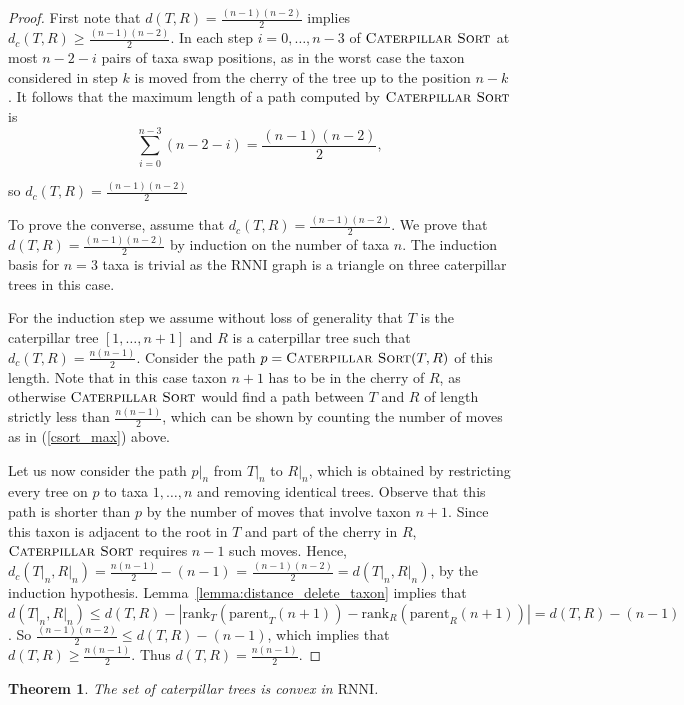\documentclass{amsart}
\newcommand{\parent}{\mathrm{parent}}
\newcommand{\rank}{\mathrm{rank}}
\newcommand{\rnni}{\mathrm{RNNI}}
\newcommand{\csort}{\textsc{Caterpillar Sort}}
\newtheorem{theorem}{Theorem}
\begin{document}
\begin{proof}
First note that $d(T,R) = \frac{(n-1)(n-2)}{2}$ implies $d_c(T,R) \geq \frac{(n-1)(n-2)}{2}$.
In each step $i=0, \ldots, n-3$ of $\csort$ at most $n-2-i$ pairs of taxa swap positions, as in the worst case the taxon considered in step $k$ is moved from the cherry of the tree up to the position $n-k$.
It follows that the maximum length of a path computed by $\csort$ is
\begin{equation}
\sum\limits_{i=0}^{n-3} (n-2-i) = \frac{(n-1)(n-2)}{2},
\label{csort_max}
\end{equation}

so $d_c(T,R) = \frac{(n-1)(n-2)}{2}$

To prove the converse, assume that $d_c(T,R) = \frac{(n-1)(n-2)}{2}$.
We prove that $d(T,R) = \frac{(n-1)(n-2)}{2}$ by induction on the number of taxa $n$.
The induction basis for $n=3$ taxa is trivial as the $\rnni$ graph is a triangle on three caterpillar trees in this case.

For the induction step we assume without loss of generality that $T$ is the caterpillar tree $[1, \ldots, n+1]$ and $R$ is a caterpillar tree such that $d_c(T, R) = \frac{n(n-1)}{2}$.
Consider the path $p = \csort(T, R)$ of this length.
Note that in this case taxon $n+1$ has to be in the cherry of $R$, as otherwise $\csort$ would find a path between $T$ and $R$ of length strictly less than $\frac{n(n-1)}{2}$, which can be shown by counting the number of moves as in (\ref{csort_max}) above.

Let us now consider the path $p\big|_n$ from $T\big|_n$ to $R\big|_n$, which is obtained by restricting every tree on $p$ to taxa $1, \ldots, n$ and removing identical trees.
Observe that this path is shorter than $p$ by the number of moves that involve taxon $n+1$.
Since this taxon is adjacent to the root in $T$ and part of the cherry in $R$, $\csort$ requires $n-1$ such moves.
Hence, $d_c(T{\big|}_n, R{\big|}_n) = \frac{n(n-1)}{2} - (n-1)$ = $\frac{(n-1)(n-2)}{2} = d(T{\big|}_n,R{\big|}_n)$, by the induction hypothesis.
Lemma~\ref{lemma:distance_delete_taxon} implies that $d(T{\big|}_n, R{\big|}_n) \leq d(T,R) - |\rank_T(\parent_T(n+1)) - \rank_R(\parent_R(n+1))| = d(T,R) - (n-1)$.
So $\frac{(n-1)(n-2)}{2} \leq d(T,R) - (n-1)$, which implies that $d(T, R) \geq \frac{n(n-1)}{2}$.
Thus $d(T, R) = \frac{n(n-1)}{2}$.
\end{proof}

\begin{theorem}
The set of caterpillar trees is convex in $\rnni$.
\label{thm:caterpillar_convex}
\end{theorem}
\end{document}
